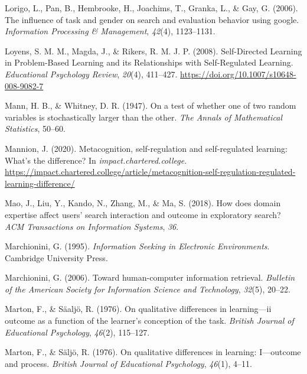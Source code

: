 \documentclass[letterpaper, nobind]{templates/ociamthesis}
\newlength{\cslhangindent}
\newenvironment{CSLReferences}[2] %
 {%
  \setlength{\parindent}{0pt}
  \ifodd #1
  \let\oldpar\par
  \def\par{\hangindent=\cslhangindent\oldpar}
  \fi
  \setlength{\parskip}{1mm}
  \setlength{\baselineskip}{6mm}
 }%
 {}
\begin{document}
\begin{CSLReferences}{1}{0}
\leavevmode{}%
Lorigo, L., Pan, B., Hembrooke, H., Joachims, T., Granka, L., \& Gay, G. (2006). The influence of task and gender on search and evaluation behavior using google. \emph{Information Processing \& Management}, \emph{42}(4), 1123--1131.

\leavevmode{}%
Loyens, S. M. M., Magda, J., \& Rikers, R. M. J. P. (2008). Self-{Directed Learning} in {Problem}-{Based Learning} and its {Relationships} with {Self}-{Regulated Learning}. \emph{Educational Psychology Review}, \emph{20}(4), 411--427. \url{https://doi.org/10.1007/s10648-008-9082-7}

\leavevmode{}%
Mann, H. B., \& Whitney, D. R. (1947). On a test of whether one of two random variables is stochastically larger than the other. \emph{The Annals of Mathematical Statistics}, 50--60.

\leavevmode{}%
Mannion, J. (2020). Metacognition, self-regulation and self-regulated learning: What's the difference? In \emph{impact.chartered.college}. \url{https://impact.chartered.college/article/metacognition-self-regulation-regulated-learning-difference/}

\leavevmode{}%
Mao, J., Liu, Y., Kando, N., Zhang, M., \& Ma, S. (2018). How does domain expertise affect users' search interaction and outcome in exploratory search? \emph{ACM Transactions on Information Systems}, \emph{36}.

\leavevmode{}%
Marchionini, G. (1995). \emph{Information {Seeking} in {Electronic Environments}}. {Cambridge University Press}.

\leavevmode{}%
Marchionini, G. (2006). Toward human-computer information retrieval. \emph{Bulletin of the American Society for Information Science and Technology}, \emph{32}(5), 20--22.

\leavevmode{}%
Marton, F., \& Säaljö, R. (1976). On qualitative differences in learning---ii outcome as a function of the learner's conception of the task. \emph{British Journal of Educational Psychology}, \emph{46}(2), 115--127.

\leavevmode{}%
Marton, F., \& Säljö, R. (1976). On qualitative differences in learning: I---outcome and process. \emph{British Journal of Educational Psychology}, \emph{46}(1), 4--11.


\end{CSLReferences}
\end{document}
